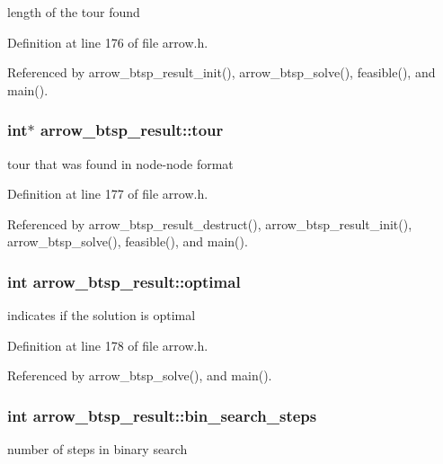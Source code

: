 length of the tour found 

Definition at line 176 of file arrow.h.

Referenced by arrow\_\-btsp\_\-result\_\-init(), arrow\_\-btsp\_\-solve(), feasible(), and main().\hypertarget{structarrow__btsp__result_ebd9a553dc3bf31f52eda0b293b0e272}{
\subsubsection{\setlength{\rightskip}{0pt plus 5cm}int$\ast$ {\bf arrow\_\-btsp\_\-result::tour}}}
\label{structarrow__btsp__result_ebd9a553dc3bf31f52eda0b293b0e272}


tour that was found in node-node format 

Definition at line 177 of file arrow.h.

Referenced by arrow\_\-btsp\_\-result\_\-destruct(), arrow\_\-btsp\_\-result\_\-init(), arrow\_\-btsp\_\-solve(), feasible(), and main().\hypertarget{structarrow__btsp__result_febcf61e24bf277eeb7795c18bd42b8b}{
\subsubsection{\setlength{\rightskip}{0pt plus 5cm}int {\bf arrow\_\-btsp\_\-result::optimal}}}
\label{structarrow__btsp__result_febcf61e24bf277eeb7795c18bd42b8b}


indicates if the solution is optimal 

Definition at line 178 of file arrow.h.

Referenced by arrow\_\-btsp\_\-solve(), and main().\hypertarget{structarrow__btsp__result_80106c5f0b8f82353ad6771ad9eaac71}{
\subsubsection{\setlength{\rightskip}{0pt plus 5cm}int {\bf arrow\_\-btsp\_\-result::bin\_\-search\_\-steps}}}
\label{structarrow__btsp__result_80106c5f0b8f82353ad6771ad9eaac71}


number of steps in binary search 

